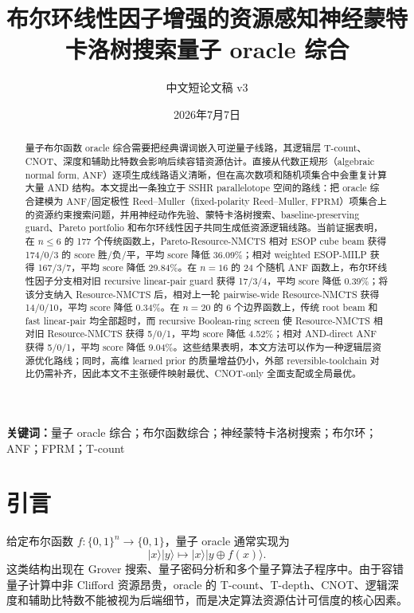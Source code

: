 \documentclass[UTF8,fontset=macnew,11pt]{ctexart}
\title{布尔环线性因子增强的资源感知神经蒙特卡洛树搜索量子 oracle 综合}
\author{中文短论文稿 v3}
\date{2026年7月7日}
\newcommand{\method}{Resource-NMCTS}
\newcommand{\pareto}{Pareto-Resource-NMCTS}
\newcommand{\anf}{\ensuremath{\mathrm{ANF}}}
\newcommand{\fprm}{\ensuremath{\mathrm{FPRM}}}
\begin{document}
\maketitle

\begin{abstract}
量子布尔函数 oracle 综合需要把经典谓词嵌入可逆量子线路，其逻辑层 T-count、CNOT、深度和辅助比特数会影响后续容错资源估计。直接从代数正规形（algebraic normal form, \anf{}）逐项生成线路语义清晰，但在高次数项和随机项集合中会重复计算大量 AND 结构。本文提出一条独立于 SSHR parallelotope 空间的路线：把 oracle 综合建模为 \anf{}/固定极性 Reed--Muller（fixed-polarity Reed--Muller, \fprm{}）项集合上的资源约束搜索问题，并用神经动作先验、蒙特卡洛树搜索、baseline-preserving guard、Pareto portfolio 和布尔环线性因子共同生成低资源逻辑线路。当前证据表明，在 $n\leq6$ 的 177 个传统函数上，\pareto{} 相对 ESOP cube beam 获得 174/0/3 的 score 胜/负/平，平均 score 降低 36.09\%；相对 weighted ESOP-MILP 获得 167/3/7，平均 score 降低 29.84\%。在 $n=16$ 的 24 个随机 \anf{} 函数上，布尔环线性因子分支相对旧 recursive linear-pair guard 获得 17/3/4，平均 score 降低 0.39\%；将该分支纳入 \method{} 后，相对上一轮 pairwise-wide \method{} 获得 14/0/10，平均 score 降低 0.34\%。在 $n=20$ 的 6 个边界函数上，传统 root beam 和 fast linear-pair 均全部超时，而 recursive Boolean-ring screen 使 \method{} 相对旧 \method{} 获得 5/0/1，平均 score 降低 4.52\%；相对 AND-direct ANF 获得 5/0/1，平均 score 降低 9.04\%。这些结果表明，本文方法可以作为一种逻辑层资源优化路线；同时，高维 learned prior 的质量增益仍小，外部 reversible-toolchain 对比仍需补齐，因此本文不主张硬件映射最优、CNOT-only 全面支配或全局最优。
\end{abstract}

\noindent\textbf{关键词：}量子 oracle 综合；布尔函数综合；神经蒙特卡洛树搜索；布尔环；ANF；FPRM；T-count

\section{引言}

给定布尔函数 $f:\{0,1\}^n\rightarrow\{0,1\}$，量子 oracle 通常实现为
\begin{equation}
  |x\rangle |y\rangle \mapsto |x\rangle |y\oplus f(x)\rangle .
  \label{eq:oracle}
\end{equation}
这类结构出现在 Grover 搜索、量子密码分析和多个量子算法子程序中。由于容错量子计算中非 Clifford 资源昂贵，oracle 的 T-count、T-depth、CNOT、逻辑深度和辅助比特数不能被视为后端细节，而是决定算法资源估计可信度的核心因素。
\end{document}
